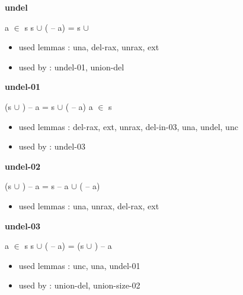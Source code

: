 \documentclass[a4paper]{article}
\begin{document}
\medskip

\bigskip

{\large\bf undel}

\medskip

 \Fol a $\in$ s \Imp s $\cup$ ( -- a) = s $\cup$ 

\begin{itemize}


\item       used lemmas  : una, del-rax, unrax, ext
\item       used by      : undel-01, union-del

\end{itemize}

\medskip

\bigskip

{\large\bf undel-01}

\medskip

 \Fol (s $\cup$ ) -- a = s $\cup$ ( -- a) \Equiv \Not a $\in$ s

\begin{itemize}


\item       used lemmas  : del-rax, ext, unrax, del-in-03, una, undel, unc
\item       used by      : undel-03

\end{itemize}

\medskip

\bigskip

{\large\bf undel-02}

\medskip

 \Fol (s $\cup$ ) -- a = s -- a $\cup$ ( -- a)

\begin{itemize}


\item       used lemmas  : una, unrax, del-rax, ext

\end{itemize}

\medskip

\bigskip

{\large\bf undel-03}

\medskip

 \Fol \Not a $\in$ s \Imp s $\cup$ ( -- a) = (s $\cup$ ) -- a

\begin{itemize}


\item       used lemmas  : unc, una, undel-01
\item       used by      : union-del, union-size-02

\end{itemize}
\end{document}

